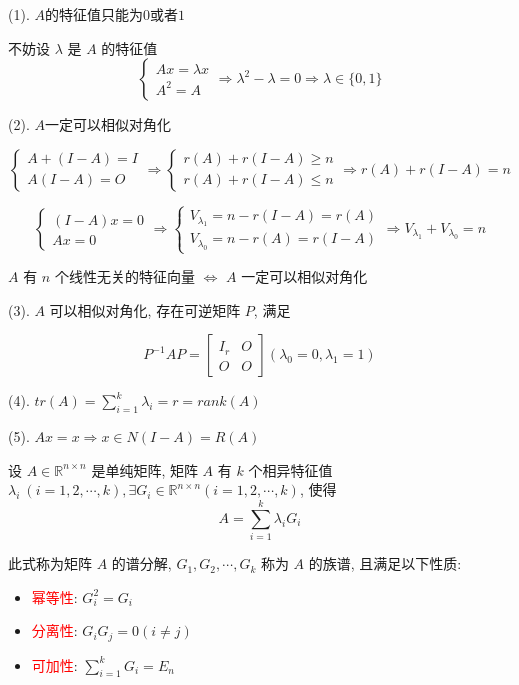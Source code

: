 \begin{anymark}[证明]

	(1). $A$的特征值只能为$0$或者$1$

	不妨设 $\lambda$ 是 $A$ 的特征值
	$$\begin{cases}
	  Ax = \lambda x\\
	  A^{2} = A
	\end{cases}\Rightarrow \lambda^{2} - \lambda = 0 \Rightarrow \lambda \in\{0, 1\}$$

	(2). $A$一定可以相似对角化

	$$\begin{cases}
	  A + (I - A) = I\\
	  A(I - A) = O
	\end{cases}\Rightarrow
	\begin{cases}
	  r(A) + r(I - A) \geq n\\
	  r(A) + r(I - A) \leq n
	\end{cases}\Rightarrow r(A) + r(I - A) =n$$
	
	$$\begin{cases}
	  (I - A)x = 0\\
	  Ax = 0
	\end{cases}\Rightarrow
	\begin{cases}
	  V_{\lambda_{1}} = n - r(I - A) = r(A)\\
	  V_{\lambda_{0}} = n - r(A) = r(I - A)
	\end{cases}\Rightarrow V_{\lambda_{1}} + V_{\lambda_{0}} = n$$

	$A$ 有 $n$ 个线性无关的特征向量 $\Leftrightarrow$ $A$ 一定可以相似对角化

	(3). $A$ 可以相似对角化, 存在可逆矩阵 $P$, 满足
	
	$$P^{-1}AP = 
	\begin{bmatrix}
	  I_{r} & O\\
	  O & O
	\end{bmatrix}(\lambda_{0} = 0, \lambda_{1} = 1)$$

	(4). $tr(A) = \sum\limits_{i = 1}^{k}\lambda_{i} = r = rank(A)$

	(5). $Ax = x\Rightarrow x\in N(I - A) = R(A)$
\end{anymark}
\begin{theorem}[谱分解定理]\label{the: 谱分解定理}
	设 $A\in\mathbb{R}^{n\times n}$ 是单纯矩阵, 矩阵 $A$ 有 $k$ 个相异特征值 $\lambda_{i}\ (i=1,2,\cdots,k), \exists G_{i}\in \mathbb{R}^{n\times n}(i=1,2,\cdots,k)$,
	使得
	$$A = \sum\limits_{i=1}^{k}\lambda_{i}G_{i}$$
	
	此式称为矩阵 $A$ 的谱分解, $G_{1},G_{2},\cdots,G_{k}$ 称为 $A$ 的族谱, 且满足以下性质: 
	\begin{itemize}
		\item \textcolor{red}{幂等性}: $G_{i}^{2} = G_{i}$
		\item \textcolor{red}{分离性}: $G_{i}G_{j} = 0(i\neq j)$
		\item \textcolor{red}{可加性}: $\sum\limits_{i=1}^{k}G_{i} = E_{n}$
	\end{itemize} 
\end{theorem}
